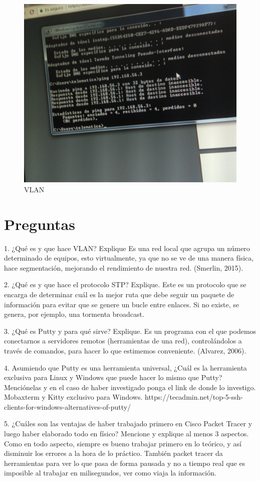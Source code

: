 \documentclass{article}
\begin{document}
\begin{figure}[h!]
\centering
\includegraphics[scale=0.12]{IMG4}
\caption{VLAN}
\end{figure}

\newpage

\section{Preguntas}
1.	¿Qué es y que hace VLAN? Explique 
Es una red local que agrupa un número determinado de equipos, esto virtualmente, ya que no se ve de una manera física, hace segmentación, mejorando el rendimiento de nuestra red. (Smerlin, 2015).\par
2.	¿Qué es y que hace el protocolo STP? Explique. 
Este es un protocolo que se encarga de determinar cuál es la mejor ruta que debe seguir un paquete de información para evitar que se genere un bucle entre enlaces. Si no existe, se genera, por ejemplo, una tormenta broadcast.\par
3.	¿Qué es Putty y para qué sirve? Explique. 
Es un programa con el que podemos conectarnos a servidores remotos (herramientas de una red), controlándolos a través de comandos, para hacer lo que estimemos conveniente. (Alvarez, 2006).\par
4.	Asumiendo que Putty es una herramienta universal, ¿Cuál es la herramienta exclusiva para Linux y Windows que puede hacer lo mismo que Putty? Menciónelas y en el caso de haber investigado ponga el link de donde lo investigo. 
Mobaxterm y Kitty exclusivo para Windows.
https://tecadmin.net/top-5-ssh-clients-for-windows-alternatives-of-putty/ \par
5.	¿Cuáles son las ventajas de haber trabajado primero en Cisco Packet Tracer y luego haber elaborado todo en físico? Mencione y explique al menos 3 aspectos.
Como en todo aspecto, siempre es bueno trabajar primero en lo teórico, y así disminuir los errores a la hora de lo práctico. También packet tracer da herramientas para ver lo que pasa de forma pausada y no a tiempo real que es imposible al trabajar en milisegundos, ver como viaja la información.
\end{document}
